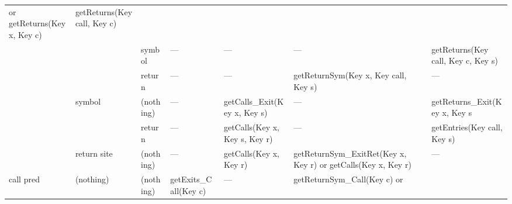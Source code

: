 \begin{sidewaystable}
\begin{tabular}{x{0.6in}x{0.6in}x{0.6in}|x{1.9in}x{1.9in}x{1.9in}x{2in}}
                                                                                                                               or getReturns(Key x, Key c)               &  getReturns(Key call, Key c)                \tabularnewline
                &                   &  symbol       &      ---                      &    ---                                &        ---                                 &  getReturns(Key call, Key c, Key s)         \tabularnewline
                &                   &  return       &      ---                      &    ---                                &  getReturnSym(Key x, Key call, \newline
                                                                                                                               \phantom{GetReturnSym(}Key s)             &    ---                                      \tabularnewline
                &  symbol           &  (nothing)    &      ---                      &  getCalls\_Exit(Key x, Key s)         &        ---                                 &  getReturns\_Exit(Key x, Key s              \tabularnewline
                &                   &  return       &      ---                      &  getCalls(Key x, Key s, Key r)        &        ---                                 &  getEntries(Key call, Key s)                \tabularnewline
                &  return site      &  (nothing)    &      ---                      &  getCalls(Key x, Key r)               &  getReturnSym\_ExitRet(Key x, Key r) \newline
                                                                                                                               or getCalls(Key x, Key r)                 &   ---                                       \tabularnewline
\midrule %
 call pred      &  (nothing)        &  (nothing)    & getExits\_Call(Key c)         &   ---                                 &  getReturnSym\_Call(Key c) or \newline

\end{tabular}
\end{sidewaystable}

